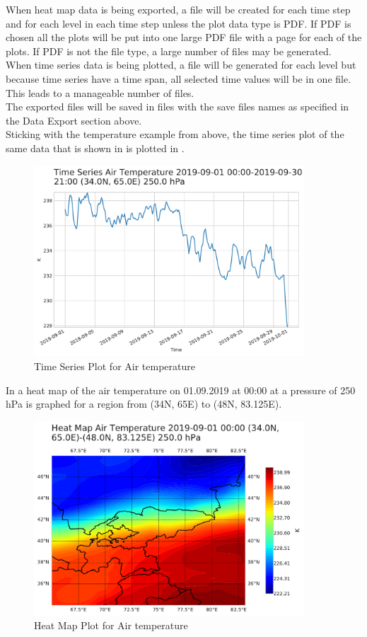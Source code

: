 \documentclass[../00_main.tex]{subfiles}
\begin{document}
When heat map data is being exported, a file will be created for each time step
and for each level in each time step unless the plot data type is PDF. If PDF
is chosen all the plots will be put into one large PDF file with a page for
each of the plots. If PDF is not the file type, a large number of
files may be generated.\\
When time series data is being plotted, a file will be generated for each
level but because time series have a time span, all selected time values will
be in one file. This leads to a manageable number of files.\\
The exported files will be saved in files with the save files names as
specified in the Data Export section above.\\
Sticking with the temperature example from above, the time series plot of the
same data that is shown in  is plotted in .
\begin{figure}[h]
    \center
    \includegraphics[width=0.9\textwidth]{../graphics/plt01}
    \caption{Time Series Plot for Air temperature}
    \label{plt:dpl01}
\end{figure}
In  a heat map of the air temperature on 01.09.2019 at 00:00
at a pressure of 250 hPa is graphed for a region from (34\textdegree{}N,
65\textdegree{}E) to (48\textdegree{}N, 83.125\textdegree{}E).
\begin{figure}[H]
    \center
    \includegraphics[width=0.9\textwidth]{../graphics/plt02}
    \caption{Heat Map Plot for Air temperature}
    \label{plt:dpl02}
\end{figure}
\end{document}
